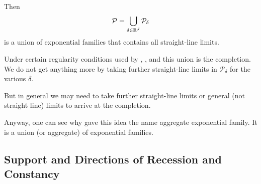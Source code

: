 Then
$$
   \mathcal{P} = \bigcup_{\delta \in \mathbb{R}^J} \mathcal{P}_\delta
$$
is a union of exponential families that contains all straight-line limits.

Under certain regularity conditions used by \citet{barndorff-nielsen},
\citet{brown}, and \citet{geyer-gdor} this union is the completion.
We do not get anything more by taking further straight-line limits
in $\mathcal{P}_\delta$ for the various $\delta$.

But in general \citep[Chapters~2 and~4]{geyer-thesis} we may need to take
further straight-line limits or general (not straight line) limits
to arrive at the completion.

Anyway, one can see why \citet{brown} gave this idea the name aggregate
exponential family.  It is a union (or aggregate) of exponential families.

\subsection{Support and Directions of Recession and Constancy}

